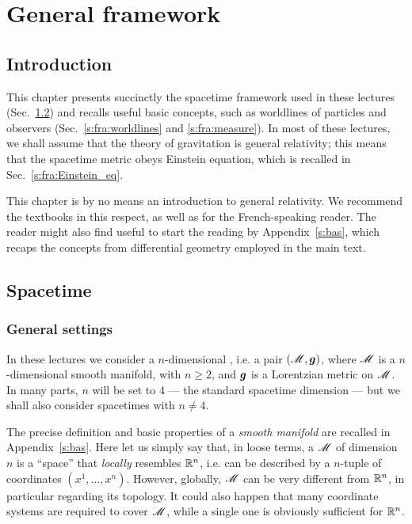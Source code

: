 \chapter{General framework} \label{s:fra}

\minitoc

\section{Introduction}

This chapter presents succinctly the spacetime framework used in these lectures
(Sec.~\ref{s:fra:spacetime})
and recalls useful basic concepts, such as worldlines of particles and observers
(Sec.~\ref{s:fra:worldlines} and \ref{s:fra:measure}).
In most of these lectures, we shall assume that the theory of gravitation is general
relativity; this means that the spacetime metric obeys Einstein equation,
which is recalled in Sec.~\ref{s:fra:Einstein_eq}.

This chapter is by no means an introduction to general relativity. We
recommend the textbooks \cite{Carro04,Choqu15,DerueU18,Hartl03,MisneTW73,Strau13,Wald84} in this
respect, as well as \cite{DerueU14,Gourg14,Langl13} for the French-speaking reader.
The reader might also find useful to start the reading by Appendix~\ref{s:bas}, which
recaps the concepts from differential geometry employed in the main text.

\section{Spacetime} \label{s:fra:spacetime}

\subsection{General settings}

In these lectures we consider a $n$-dimensional ,
i.e. a pair $(\mathscr{M}, \bm{g})$, where $\mathscr{M}$ is a $n$-dimensional smooth manifold, with $n\geq 2$, and $\bm{g}$ is a Lorentzian metric on $\mathscr{M}$. In many parts, $n$ will be set to 4
--- the standard spacetime dimension --- but we shall also consider spacetimes with
$n\neq 4$.

The precise definition and basic properties of a \emph{smooth manifold} are recalled
in Appendix~\ref{s:bas}. Here let us simply say that, in loose terms,
a  $\mathscr{M}$ of dimension $n$ is a ``space'' that \emph{locally} resembles $\mathbb{R}^n$,
i.e. can be described by a $n$-tuple of coordinates $(x^1,\ldots,x^n)$. However, globally,
$\mathscr{M}$ can be very different from $\mathbb{R}^n$, in particular regarding its topology. It could also happen
that many coordinate systems are required to cover $\mathscr{M}$, while a single one is obviously
sufficient for $\mathbb{R}^n$.

